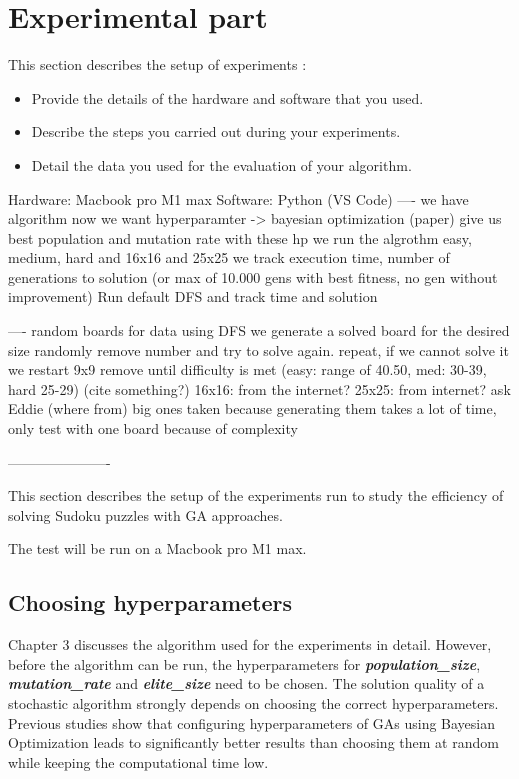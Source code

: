 \section{Experimental part}
\label{sec:experimentation}

{\color{red}
This section describes the setup of experiments \cite{zobel2014experimentation}:

\begin{itemize}
    \item Provide the details of the hardware and software that you used.
    \item Describe the steps you carried out during your experiments.
    \item Detail the data you used for the evaluation of your algorithm.
\end{itemize}
}

Hardware: Macbook pro M1 max
Software: Python (VS Code)
----
we have algorithm
now we want hyperparamter -> bayesian optimization (paper)
give us best population and mutation rate
with these hp we run the algrothm easy, medium, hard and 16x16 and 25x25
we track execution time, number of generations to solution (or max of 10.000 gens with best fitness, no gen without improvement)
Run default DFS and track time and solution 

----
random boards for data
using DFS we generate a solved board for the desired size
randomly remove number and try to solve again. repeat, if we cannot solve it we restart
9x9 remove until difficulty is met (easy: range of 40.50, med: 30-39, hard 25-29) (cite something?)
16x16: from the internet?
25x25: from internet? ask Eddie (where from)
big ones taken because generating them takes a lot of time, only test with one board because of complexity

----------------------

This section describes the setup of the experiments run to study the efficiency of solving Sudoku puzzles with GA approaches.

The test will be run on a Macbook pro M1 max.

\subsection{Choosing hyperparameters}
Chapter 3 discusses the algorithm used for the experiments in detail. However, before the algorithm can be run, the hyperparameters for \textit{\textbf{population\_size}}, \textit{\textbf{mutation\_rate}} and \textit{\textbf{elite\_size}} need to be chosen. The solution quality of a stochastic algorithm strongly depends on choosing the correct hyperparameters. Previous studies show that configuring hyperparameters of GAs using Bayesian Optimization leads to significantly better results than choosing them at random while keeping the computational time low\cite{Ruether}.

